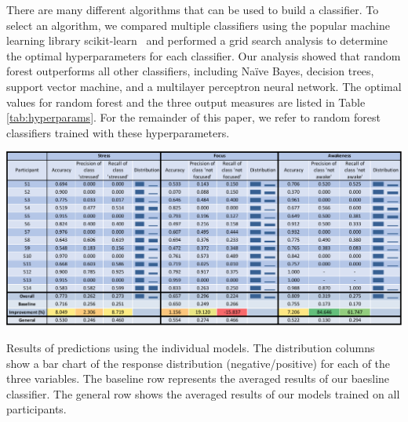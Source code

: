 There are many different algorithms that can be used to build a classifier. To select an
algorithm, we compared multiple classifiers using the popular machine learning library scikit-learn~\cite{pedregosa11} and performed a grid search analysis to determine the optimal hyperparameters for each classifier. Our analysis showed that random forest outperforms all other classifiers, including Na\"ive Bayes, decision trees, support vector machine, and a multilayer perceptron neural network. The optimal values for random forest and the three output measures are listed in Table \ref{tab:hyperparams}. For the remainder of this paper, we refer to random forest classifiers trained with these hyperparameters.%



\begin{table}[h]
  \centering
  \includegraphics[width=1.0\textwidth]{rq1performance.pdf}
  \caption{Results of predictions using the individual models. The distribution columns show a bar chart of the response distribution (negative/positive) for each of the three variables. The baseline row represents the averaged results of our baesline classifier. The general row shows the averaged results of our models trained on all participants.}\label{tab:accuracy}%
  \vspace*{-4mm}
\end{table}

